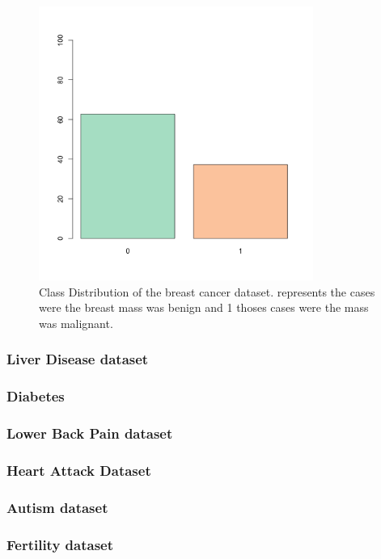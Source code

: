 \begin{figure}[H]
    \centering
    \includegraphics[width=0.8\textwidth]{ThesisTemplate/usingLatex/chapter4Images/figure4_4.png}
    \caption{Class Distribution of the breast cancer dataset. represents the cases were the breast mass was benign and 1 thoses cases were the mass was malignant.}
    \label{fig:my_label}
\end{figure}

\subsubsection{Liver Disease dataset}



\subsubsection{Diabetes}
\subsubsection{Lower Back Pain dataset}
\subsubsection{Heart Attack Dataset}
\subsubsection{Autism dataset}
\subsubsection{Fertility dataset}

